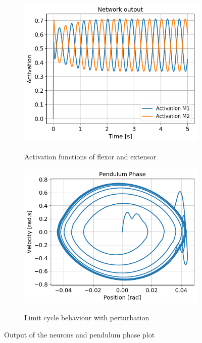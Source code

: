 \documentclass{cmc}
\begin{document}
\begin{figure}[H]
  \centering
  \begin{subfigure}[b]{0.49\textwidth}
    { \centering
      \includegraphics[width=\textwidth]{figures/3a_Output_Neuron.png} }
    \caption{Activation functions of flexor and extensor}
    \label{fig:3a_output}
  \end{subfigure}
  \begin{subfigure}[b]{0.49\textwidth}
    { \centering
      \includegraphics[width=\textwidth]{figures/3a_Pendulum_Phase.png} }
    \caption{Limit cycle behaviour with perturbation}
    \label{fig:3a_phase}
  \end{subfigure}
  \caption{Output of the neurons and pendulum phase plot}
  \label{fig:3a}
\end{figure}
\end{document}
